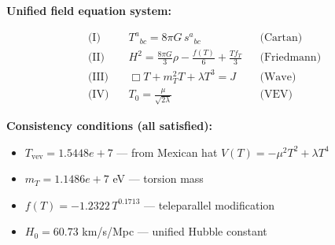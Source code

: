 
\textbf{Unified field equation system:}

\begin{align}
  \text{(I)} \quad & T^a{}_{bc} = 8\pi G \, s^a{}_{bc} && \text{(Cartan)} \\
  \text{(II)} \quad & H^2 = \frac{8\pi G}{3}\rho - \frac{f(T)}{6} + \frac{Tf_T}{3} && \text{(Friedmann)} \\
  \text{(III)} \quad & \Box T + m_T^2 T + \lambda T^3 = J && \text{(Wave)} \\
  \text{(IV)} \quad & T_0 = \frac{\mu}{\sqrt{2\lambda}} && \text{(VEV)}
\end{align}

\textbf{Consistency conditions (all satisfied):}
\begin{itemize}
  \item $T_{\text{vev}} = 1.5448e+7$ — from Mexican hat $V(T) = -\mu^2 T^2 + \lambda T^4$
  \item $m_T = 1.1486e+7$ eV — torsion mass
  \item $f(T) = -1.2322 \, T^{0.1713}$ — teleparallel modification
  \item $H_0 = 60.73$ km/s/Mpc — unified Hubble constant
\end{itemize}